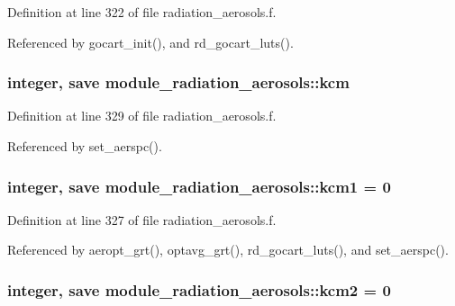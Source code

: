 Definition at line 322 of file radiation\+\_\+aerosols.\+f.



Referenced by gocart\+\_\+init(), and rd\+\_\+gocart\+\_\+luts().

\subsubsection[{\texorpdfstring{kcm}{kcm}}]{\setlength{\rightskip}{0pt plus 5cm}integer, save module\+\_\+radiation\+\_\+aerosols\+::kcm\hspace{0.3cm}{\ttfamily [private]}}\hypertarget{namespacemodule__radiation__aerosols_a4816bc93b826ff2fad9ff0805ea39fd5}{}\label{namespacemodule__radiation__aerosols_a4816bc93b826ff2fad9ff0805ea39fd5}


Definition at line 329 of file radiation\+\_\+aerosols.\+f.



Referenced by set\+\_\+aerspc().

\subsubsection[{\texorpdfstring{kcm1}{kcm1}}]{\setlength{\rightskip}{0pt plus 5cm}integer, save module\+\_\+radiation\+\_\+aerosols\+::kcm1 = 0\hspace{0.3cm}{\ttfamily [private]}}\hypertarget{namespacemodule__radiation__aerosols_a92b09dd26cc321af3b5da0b1c310a588}{}\label{namespacemodule__radiation__aerosols_a92b09dd26cc321af3b5da0b1c310a588}


Definition at line 327 of file radiation\+\_\+aerosols.\+f.



Referenced by aeropt\+\_\+grt(), optavg\+\_\+grt(), rd\+\_\+gocart\+\_\+luts(), and set\+\_\+aerspc().

\subsubsection[{\texorpdfstring{kcm2}{kcm2}}]{\setlength{\rightskip}{0pt plus 5cm}integer, save module\+\_\+radiation\+\_\+aerosols\+::kcm2 = 0\hspace{0.3cm}{\ttfamily [private]}}\hypertarget{namespacemodule__radiation__aerosols_ab2be28697a95bcec8d5cd8de7ebd4328}{}\label{namespacemodule__radiation__aerosols_ab2be28697a95bcec8d5cd8de7ebd4328}


